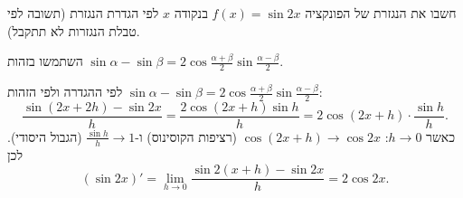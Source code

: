 
\begin{question}
חשבו את הנגזרת של הפונקציה $f(x)=\sin2x$ בנקודה $x$ לפי הגדרת הנגזרת (תשובה לפי טבלת הנגזרות לא תתקבל).
\end{question}

\begin{hint}
השתמשו בזהות $\sin\alpha-\sin\beta=2\cos\frac{\alpha+\beta}{2}\sin\frac{\alpha-\beta}{2}$.
\end{hint}

\begin{solution}
לפי ההגדרה ולפי הזהות $\sin\alpha-\sin\beta=2\cos\frac{\alpha+\beta}{2}\sin\frac{\alpha-\beta}{2}$:
\[
\frac{\sin(2x+2h)-\sin2x}{h}=\frac{2\cos(2x+h)\sin h}{h}=2\cos(2x+h)\cdot\frac{\sin h}{h}.
\]
כאשר $h\to0$: $\cos(2x+h)\to\cos2x$ (רציפות הקוסינוס) ו-$\frac{\sin h}{h}\to1$ (הגבול היסודי). לכן
\[
(\sin2x)'=\lim_{h\to0}\frac{\sin2(x+h)-\sin2x}{h}=2\cos2x.
\]
\end{solution}

